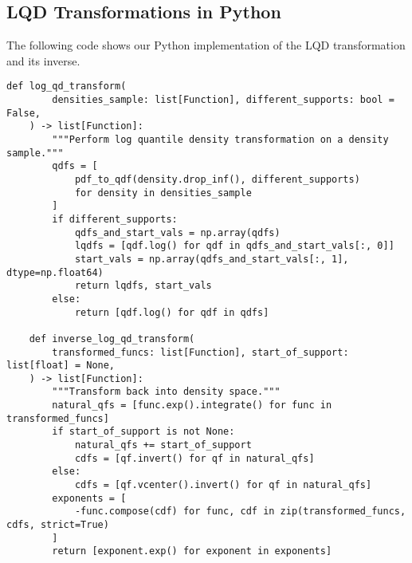\subsection{LQD Transformations in Python}
\label{sec:code_lqd}
The following code shows our Python implementation of the LQD transformation and its
inverse.
\begin{lstlisting}[style=python]
    def log_qd_transform(
        densities_sample: list[Function], different_supports: bool = False,
    ) -> list[Function]:
        """Perform log quantile density transformation on a density sample."""
        qdfs = [
            pdf_to_qdf(density.drop_inf(), different_supports)
            for density in densities_sample
        ]
        if different_supports:
            qdfs_and_start_vals = np.array(qdfs)
            lqdfs = [qdf.log() for qdf in qdfs_and_start_vals[:, 0]]
            start_vals = np.array(qdfs_and_start_vals[:, 1], dtype=np.float64)
            return lqdfs, start_vals
        else:
            return [qdf.log() for qdf in qdfs]

    def inverse_log_qd_transform(
        transformed_funcs: list[Function], start_of_support: list[float] = None,
    ) -> list[Function]:
        """Transform back into density space."""
        natural_qfs = [func.exp().integrate() for func in transformed_funcs]
        if start_of_support is not None:
            natural_qfs += start_of_support
            cdfs = [qf.invert() for qf in natural_qfs]
        else:
            cdfs = [qf.vcenter().invert() for qf in natural_qfs]
        exponents = [
            -func.compose(cdf) for func, cdf in zip(transformed_funcs, cdfs, strict=True)
        ]
        return [exponent.exp() for exponent in exponents]
\end{lstlisting}

\newpage
